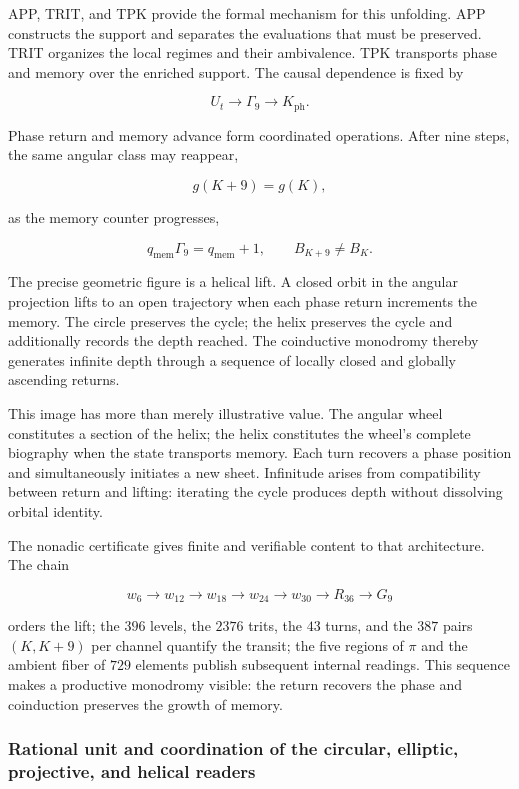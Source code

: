 APP, TRIT, and TPK provide the formal mechanism for this unfolding. APP constructs the support and separates the evaluations that must be preserved. TRIT organizes the local regimes and their ambivalence. TPK transports phase and memory over the enriched support. The causal dependence is fixed by

\[
U_t\longrightarrow \Gamma_9\longrightarrow K_{\mathrm{ph}}.
\]

Phase return and memory advance form coordinated operations. After nine steps, the same angular class may reappear,

\[
g(K+9)=g(K),
\]

as the memory counter progresses,

\[
q_{\mathrm{mem}}\Gamma_9=q_{\mathrm{mem}}+1,
\qquad
B_{K+9}\neq B_K.
\]

The precise geometric figure is a helical lift. A closed orbit in the angular projection lifts to an open trajectory when each phase return increments the memory. The circle preserves the cycle; the helix preserves the cycle and additionally records the depth reached. The coinductive monodromy thereby generates infinite depth through a sequence of locally closed and globally ascending returns.

This image has more than merely illustrative value. The angular wheel constitutes a section of the helix; the helix constitutes the wheel's complete biography when the state transports memory. Each turn recovers a phase position and simultaneously initiates a new sheet. Infinitude arises from compatibility between return and lifting: iterating the cycle produces depth without dissolving orbital identity.

The nonadic certificate gives finite and verifiable content to that architecture. The chain

\[
w_6\longrightarrow w_{12}\longrightarrow w_{18}\longrightarrow
w_{24}\longrightarrow w_{30}\longrightarrow R_{36}\longrightarrow G_9
\]

orders the lift; the \(396\) levels, the \(2376\) trits, the \(43\) turns, and the \(387\) pairs \((K,K+9)\) per channel quantify the transit; the five regions of \(\pi\) and the ambient fiber of \(729\) elements publish subsequent internal readings. This sequence makes a productive monodromy visible: the return recovers the phase and coinduction preserves the growth of memory.

\subsubsection{Rational unit and coordination of the circular, elliptic, projective, and helical readers}

